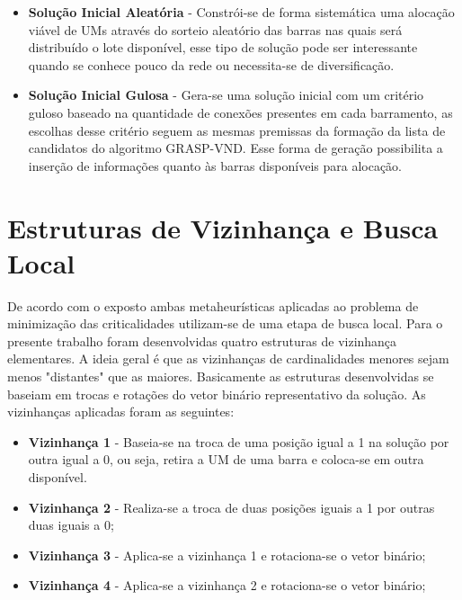 \documentclass[12pt]{article}
\begin{document}
\begin{itemize}
	\item \textbf{Solução Inicial Aleatória} - Constrói-se de forma sistemática uma alocação viável de UMs através do sorteio aleatório das barras nas quais será distribuído o lote disponível, esse tipo de solução pode ser interessante quando se conhece pouco da rede ou necessita-se de diversificação.
	
	\item \textbf{Solução Inicial Gulosa} - Gera-se uma solução inicial com um critério guloso baseado na quantidade de conexões presentes em cada barramento, as escolhas desse critério seguem as mesmas premissas da formação da lista de candidatos do algoritmo GRASP-VND. Esse forma de geração possibilita a inserção de informações quanto às barras disponíveis para alocação.
\end{itemize}
	


\section{Estruturas de Vizinhança e Busca Local}

De acordo com o exposto ambas metaheurísticas aplicadas ao problema de minimização das criticalidades utilizam-se de uma etapa de busca local. Para o presente trabalho foram desenvolvidas quatro estruturas de vizinhança elementares. A ideia geral é que as vizinhanças de cardinalidades menores sejam menos "distantes" que as maiores. Basicamente as estruturas desenvolvidas se baseiam em trocas e rotações do vetor binário representativo da solução. As vizinhanças aplicadas foram as seguintes:

\begin{itemize}
	\item \textbf{Vizinhança 1} - Baseia-se na troca de uma posição igual a 1 na solução por outra igual a 0, ou seja, retira a UM de uma barra e coloca-se em outra disponível.
	\item \textbf{Vizinhança 2} - Realiza-se a troca de duas posições iguais a 1 por outras duas iguais a 0;
	\item \textbf{Vizinhança 3} - Aplica-se a vizinhança 1 e rotaciona-se o vetor binário;
	\item \textbf{Vizinhança 4} - Aplica-se a vizinhança 2 e rotaciona-se o vetor binário;
\end{itemize}
\end{document}
